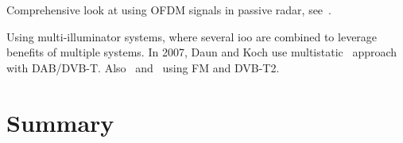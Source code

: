 \documentclass[class=report,11pt,crop=false]{standalone}
\begin{document}
Comprehensive look at using OFDM signals in passive radar, see~\cite{Berger2010}.

Using multi-illuminator systems, where several \gls{ioo} are combined to leverage benefits of multiple systems. In 2007, Daun and Koch use multistatic~\cite{Daun2007} approach with DAB/DVB-T. Also~\cite{Edrich2014} and~\cite{Paine2018} using FM and DVB-T2.

\section{Summary}

\ifstandalone

\printnoidxglossary[type=\acronymtype,nonumberlist]
\fi
\end{document}
